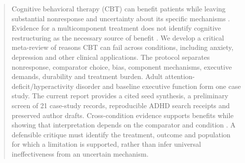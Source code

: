 \begin{abstract}
Cognitive behavioral therapy (CBT) can benefit patients while leaving substantial nonresponse and uncertainty about its specific mechanisms \citep{Loerinc2015,Carpenter2018}.
Evidence for a multicomponent treatment does not identify cognitive restructuring as the necessary source of benefit \citep{Jacobson1996}.
We develop a critical meta-review of reasons CBT can fail across conditions, including anxiety, depression and other clinical applications.
The protocol separates nonresponse, comparator choice, bias, component mechanisms, executive demands, durability and treatment burden.
Adult attention-deficit/hyperactivity disorder and baseline executive function form one case study.
The current report provides a cited seed synthesis, a preliminary screen of 21 case-study records, reproducible ADHD search receipts and preserved author drafts.
Cross-condition evidence supports benefits while showing that interpretation depends on the comparator and condition \citep{Cuijpers2025}.
A defensible critique must identify the treatment, outcome and population for which a limitation is supported, rather than infer universal ineffectiveness from an uncertain mechanism.
\end{abstract}

